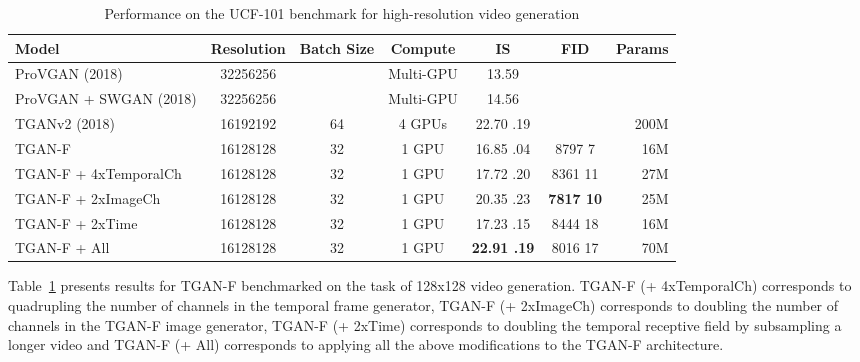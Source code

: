\documentclass[a4paper,fleqn]{cas-sc}
\begin{document}
\begin{table}[pos=!h]
\centering
\caption{Performance on the UCF-101 benchmark for high-resolution video generation}
\label{table:tgan_is128}
    \begin{tabular}{lcccccr}
    \hline Model                                                   &   Resolution                      &  Batch Size   &     Compute   &   IS    &     FID                   & Params  \\
    \hline
    ProVGAN \cite{AcharyaHPG2018towards} (2018)             &   32256256        &               &    Multi-GPU  &     13.59                 &                           &    \\
ProVGAN + SWGAN \cite{AcharyaHPG2018towards} (2018)     &   32256256        &               &   Multi-GPU   &    14.56                  &                           &   \\
TGANv2  \cite{saito2018tganv2} (2018)                   &   16192192        &     64        &    4 GPUs     & 22.70  .19           &                           &  200M \\
    \hline
    TGAN-F                                                  &   16128128        &     32        &   1 GPU       & 16.85  .04  & 8797  7   &  16M \\
    TGAN-F + 4xTemporalCh                                   &   16128128        &     32        &   1 GPU       & 17.72  .20  & 8361  11   &   27M \\
    TGAN-F + 2xImageCh                                      &   16128128        &     32        &   1 GPU       & 20.35  .23  & \textbf{7817  10}   &   25M \\
    TGAN-F + 2xTime                                         &   16128128        &     32        &   1 GPU       & 17.23  .15  & 8444  18   &   16M \\
    \hline
    TGAN-F + All                                          &   16128128        &     32        &   1 GPU       & \textbf{22.91  .19}        &  8016  17       &   70M \\
    \hline \end{tabular}
\end{table}

Table~\ref{table:tgan_is128} presents results for TGAN-F benchmarked on the task of 128x128 video generation. TGAN-F (+ 4xTemporalCh) corresponds to quadrupling the number of channels in the temporal frame generator, TGAN-F (+ 2xImageCh) corresponds to doubling the number of channels in the TGAN-F image generator, TGAN-F (+ 2xTime) corresponds to doubling the temporal receptive field by subsampling a longer video and TGAN-F (+ All) corresponds to applying all the above modifications to the TGAN-F architecture. 
\end{document}
